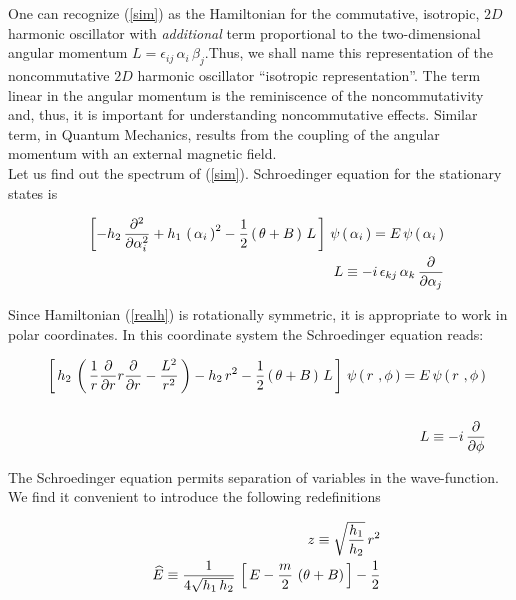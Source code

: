 \documentclass[a4paper,aps,prd,preprint]{revtex4}
\begin{document}
 One can recognize (\ref{sim}) as the Hamiltonian for the  commutative, 
 isotropic, $2D$
 harmonic oscillator with {\it additional} term proportional to the
 two-dimensional angular momentum $L=\epsilon_{ij}\, \alpha_i\,\beta_j$.Thus, 
 we shall name this representation of the noncommutative $2D$ harmonic 
 oscillator ``isotropic representation''. The
 term linear in the angular momentum is the reminiscence of the 
 noncommutativity and, thus, it is important for understanding  noncommutative 
 effects. Similar term, in Quantum Mechanics, results from the coupling of the 
 angular momentum with an external magnetic field.   \\  
 Let us find out the spectrum of (\ref{sim}).  
 Schroedinger equation for the stationary states  is
 
 \begin{eqnarray}
  &&\left[ - h_2\,{\partial^2\over\partial \alpha_i^2}    
  +h_1\, \left(\, \alpha_i\, \right)^2 
  -{1\over 2}\left(\, \theta + B\,\right)\,  L\, \right]\,
 \psi\left(\,\alpha_i\,\right)= E\, \psi\left(\,\alpha_i\,\right)
 \label{realh}\\
 &&  L\equiv -i\,\epsilon_{kj}\,\alpha_k \,{\partial\over\partial\alpha_j}
  \label{ang}
 \end{eqnarray}
 
 Since Hamiltonian (\ref{realh})  is rotationally symmetric, it is
 appropriate to work in polar coordinates. In this
 coordinate system the  Schroedinger equation reads:   
 
\begin{eqnarray}
  &&\left[\, h_2\, \left(\, {1\over r}{\partial\over\partial r}r
  {\partial\over\partial r}-{  L^2\over r^2} \, 
  \right)  - h_2\,r^2 -{1\over 2}
 \left(\, \theta + B\,\right)\,  L\, \right]\,
 \psi\left(\,r\ ,\phi\,\right)= E\, \psi\left(\,r\ ,\phi\,\right)
 \label{radial}\nonumber\\
 && \\
 &&  L\equiv -i\,{\partial\over\partial\phi}
  \label{angular}
 \end{eqnarray}
 
 The Schroedinger equation  permits separation of variables in the  
 wave-function. We find it convenient to introduce the following redefinitions 
 
 \begin{eqnarray}
 &&z\equiv \sqrt{h_1\over h_2}\, r^2\\
 &&\widehat E\equiv {1\over 4\sqrt{h_1\, h_2} }\,\left[\, E- {m\over
 2}\,\left(\theta +B\right)\,\right]-{1\over 2}
 \end{eqnarray}
 
\end{document}
